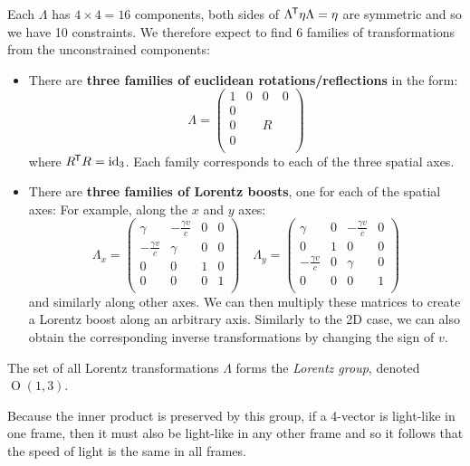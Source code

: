 \documentclass[../main.tex]{subfiles}
\begin{document}
Each $\Lambda$ has $4 \times 4 = 16$ components, both sides of $\Lambda^{{\mkern-1.5mu\mathsf{T}}} \eta \Lambda = \eta$ are symmetric and so we have 10 constraints.
We therefore expect to find $6$ families of transformations from the unconstrained components:
\begin{itemize}
  \item There are \textbf{three families of euclidean rotations/reflections} in the form:
    \[
      \Lambda = \begin{pmatrix}
      1 & 0 & 0 & 0 \\
      0 &  &  &  \\
      0 &  & R &  \\
      0 &  &  &  \\
      \end{pmatrix}
    \]
    where $R^{{\mkern-1.5mu\mathsf{T}}}R = \mathrm{id}_3$.
    Each family corresponds to each of the three spatial axes.
  \item There are \textbf{three families of Lorentz boosts}, one for each of the spatial axes:
    For example, along the $x$ and $y$ axes:
    \[
      \Lambda_x = \begin{pmatrix}
      \gamma & -\frac{\gamma v}{c} & 0 & 0 \\
      -\frac{\gamma v}{c} & \gamma & 0 & 0 \\
      0 & 0 & 1 & 0 \\
      0 & 0 & 0 & 1 \\
      \end{pmatrix}\quad
      \Lambda_y = \begin{pmatrix}
      \gamma & 0 & -\frac{\gamma v}{c} & 0 \\
      0 & 1 & 0 & 0 \\
      -\frac{\gamma v}{c} & 0 & \gamma & 0 \\
      0 & 0 & 0 & 1 \\
      \end{pmatrix}
    \]
    and similarly along other axes.
    We can then multiply these matrices to create a Lorentz boost along an arbitrary axis.
    Similarly to the 2D case, we can also obtain the corresponding inverse transformations by changing the sign of $v$.
\end{itemize}
\begin{definition}
  The set of all Lorentz transformations $\Lambda$ forms the \textit{Lorentz group}, denoted $\operatorname{O}(1, 3)$.
\end{definition}
\begin{remark}
  Because the inner product is preserved by this group, if a 4-vector is light-like in one frame, then it must also be light-like in any other frame and so it follows that the speed of light is the same in all frames.
\end{remark}
\end{document}
